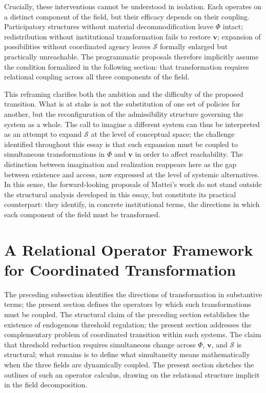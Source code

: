 \documentclass[11pt, a4paper]{article}
\begin{document}
Crucially, these interventions cannot be understood in isolation. Each operates on a distinct component of the field, but their efficacy depends on their coupling. Participatory structures without material decommodification leave $\Phi$ intact; redistribution without institutional transformation fails to restore $\mathbf{v}$; expansion of possibilities without coordinated agency leaves $\mathcal{S}$ formally enlarged but practically unreachable. The programmatic proposals therefore implicitly assume the condition formalized in the following section: that transformation requires relational coupling across all three components of the field.

This reframing clarifies both the ambition and the difficulty of the proposed transition. What is at stake is not the substitution of one set of policies for another, but the reconfiguration of the admissibility structure governing the system as a whole. The call to imagine a different system can thus be interpreted as an attempt to expand $\mathcal{S}$ at the level of conceptual space; the challenge identified throughout this essay is that such expansion must be coupled to simultaneous transformations in $\Phi$ and $\mathbf{v}$ in order to affect reachability. The distinction between imagination and realization reappears here as the gap between existence and access, now expressed at the level of systemic alternatives. In this sense, the forward-looking proposals of Mattei's work do not stand outside the structural analysis developed in this essay, but constitute its practical counterpart: they identify, in concrete institutional terms, the directions in which each component of the field must be transformed.


\section{A Relational Operator Framework for Coordinated Transformation}

The preceding subsection identifies the directions of transformation in substantive terms; the present section defines the operators by which such transformations must be coupled. The structural claim of the preceding section establishes the existence of endogenous threshold regulation; the present section addresses the complementary problem of coordinated transition within such systems. The claim that threshold reduction requires simultaneous change across $\Phi$, $\mathbf{v}$, and $\mathcal{S}$ is structural; what remains is to define what simultaneity means mathematically when the three fields are dynamically coupled. The present section sketches the outlines of such an operator calculus, drawing on the relational structure implicit in the field decomposition.
\end{document}
